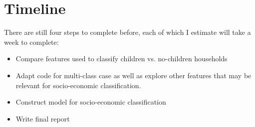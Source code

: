 \documentclass[12pt,a4paper]{article}
\begin{document}
\section*{Timeline}

There are still four steps to complete before, each of which I estimate will take a week to complete:
\begin{itemize}
	\item Compare features used to classify children vs. no-children households
	\item Adapt code for multi-class case as well as explore other features that may be relevant for socio-economic classification.
	\item Construct model for socio-economic classification
	\item Write final report
\end{itemize}
\end{document}
